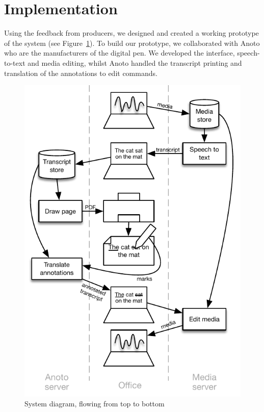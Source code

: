\section{Implementation}
Using the feedback from producers, we designed and created a working prototype
of the system (see Figure~\ref{fig:diagram}). To build our prototype, we
collaborated with Anoto who are the manufacturers of the digital pen. We
developed the interface, speech-to-text and media editing, whilst Anoto
handled the transcript printing and translation of the annotations to edit
commands. 

\begin{figure}[h]
  \centering
  \includegraphics[width=\columnwidth]{figs/uist-sys-diagram}
  \caption{System diagram, flowing from top to bottom}
  \label{fig:diagram}
\end{figure}

